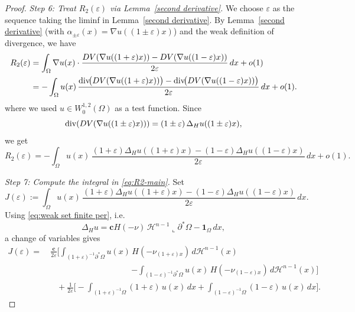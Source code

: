 \documentclass[reqno,11pt]{amsart}
\numberwithin{equation}{section}
\theoremstyle{remark}
\begin{document}
\begin{proof}
\medskip
\noindent\textit{Step 6: Treat $R_2(\varepsilon)$ via Lemma~\ref{second derivative}.}
{We choose $\varepsilon$ as the sequence taking the liminf in Lemma~\ref{second derivative}.}
By Lemma~\ref{second derivative} (with $\alpha_{\pm\varepsilon}(x)=\nabla u((1\pm\varepsilon)x)$) and the {weak definition of divergence}, we have
\begin{align*}
R_2(\varepsilon)
&=
\int_{\Omega} \nabla u(x)\cdot
\frac{DV(\nabla u((1+\varepsilon)x))-DV(\nabla u((1-\varepsilon)x))}{2\varepsilon}\,dx
+o(1)\\
&=
-\int_{\Omega} u(x)\,
\frac{{\rm div}\!\big(DV(\nabla u((1+\varepsilon)x))\big)-{\rm div}\!\big(DV(\nabla u((1-\varepsilon)x))\big)}{2\varepsilon}\,dx
+o(1).
\end{align*}
where {we used $u\in W^{1,2}_0(\Omega)$ as a test function.}
Since 
$${\rm div}(DV(\nabla u((1\pm\varepsilon)x)))=(1\pm\varepsilon)\,\Delta_Hu((1\pm\varepsilon)x),$$ 
we get
\begin{equation}\label{eq:R2-main}
R_2(\varepsilon)
=
-\int_{\Omega} u(x)\,
\frac{(1+\varepsilon)\Delta_H u((1+\varepsilon)x)-(1-\varepsilon)\Delta_H u((1-\varepsilon)x)}{2\varepsilon}\,dx
+o(1).
\end{equation}

\medskip
\noindent\textit{Step 7: Compute the integral in \eqref{eq:R2-main}.}
Set
\[
J(\varepsilon):=\int_{\Omega} u(x)\,
\frac{(1+\varepsilon)\Delta_H u((1+\varepsilon)x)-(1-\varepsilon)\Delta_H u((1-\varepsilon)x)}{2\varepsilon}\,dx.
\]
Using \eqref{eq:weak set finite per}, i.e.
\[
\Delta_H u=\mathbf{c}H(-\nu)\,\mathscr{H}^{n-1}\llcorner \partial^*\Omega - \mathbf{1}_{\Omega}\,dx,
\]
a change of variables gives
\begin{align*}
J(\varepsilon)
=&\ \frac{\mathbf c}{2\varepsilon}\Bigg[
{\int_{(1+\varepsilon)^{-1}\partial^*\Omega} u(x)\,H(-\nu_{(1+\varepsilon)x})\, d\mathscr H^{n-1}(x)}\\
&\qquad \qquad \qquad \qquad \qquad 
{-\int_{(1-\varepsilon)^{-1}\partial^*\Omega} u(x)\,H(-\nu_{(1-\varepsilon)x})\, d\mathscr H^{n-1}(x)}
\Bigg]\\
&\quad +\frac{1}{2\varepsilon}\Bigg[
-\int_{(1+\varepsilon)^{-1}\Omega}(1+\varepsilon)\,u(x)\,dx
+\int_{(1-\varepsilon)^{-1}\Omega}(1-\varepsilon)\,u(x)\,dx
\Bigg].
\end{align*}


\end{proof}
\end{document}
